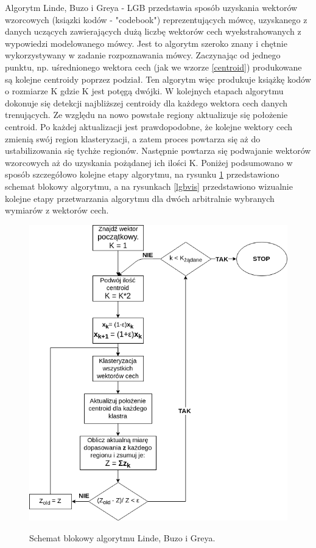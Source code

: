 Algorytm Linde, Buzo i Greya - LGB \cite{linde} przedstawia sposób uzyskania wektorów wzorcowych (ksiązki kodów - "codebook") reprezentujących mówcę, uzyskanego z danych uczących zawierających dużą liczbę wektorów cech wyekstrahowanych z wypowiedzi modelowanego mówcy. Jest to algorytm szeroko znany i chętnie wykorzystywany \cite{minidsp} w zadanie rozpoznawania mówcy. Zaczynając od jednego punktu, np. uśrednionego wektora cech (jak we wzorze \ref{centroid}) produkowane są kolejne centroidy poprzez podział. Ten algorytm więc produkuje książkę kodów o rozmiarze K gdzie K jest potęgą dwójki. W kolejnych etapach algorytmu dokonuje się detekcji najbliższej centroidy dla każdego wektora cech danych trenujących. Ze względu na nowo powstałe regiony aktualizuje się położenie centroid. Po każdej aktualizacji jest prawdopodobne, że kolejne wektory cech zmienią swój region klasteryzacji, a zatem proces powtarza się aż do ustabilizowania się tychże regionów. Następnie powtarza się podwajanie wektorów wzorcowych aż do uzyskania pożądanej ich ilości K. Poniżej podsumowano w sposób szczegółowo kolejne etapy algorytmu, na rysunku \ref{lgbblock} przedstawiono schemat blokowy algorytmu, a na rysunkach \ref{lgbvis} przedstawiono wizualnie kolejne etapy przetwarzania algorytmu dla dwóch arbitralnie wybranych wymiarów z wektorów cech.
\\


\begin{figure}[ht!]
  \centering
    \includegraphics[width=1\textwidth]{lbgdiagram.png}
    \label{lgbblock}
    \caption{Schemat blokowy algorytmu Linde, Buzo i Greya. \cite{minidsp}}
\end{figure}

